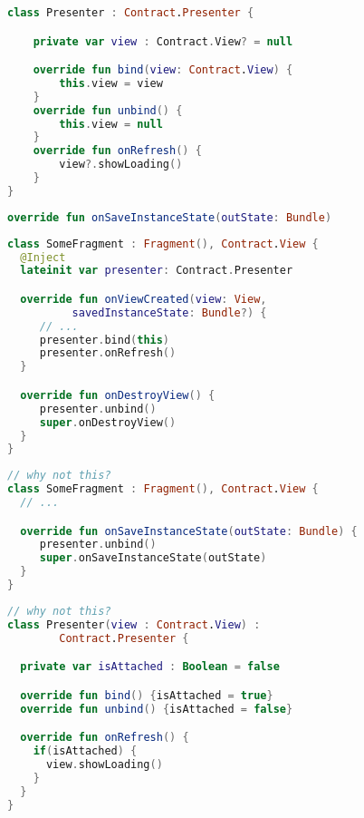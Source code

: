 \documentclass[10pt]{beamer}
\begin{document}
\begin{frame}[fragile]
\begin{lstlisting}[language=Kotlin, basicstyle=\ttfamily]
class Presenter : Contract.Presenter {

    private var view : Contract.View? = null

    override fun bind(view: Contract.View) {
        this.view = view
    }
    override fun unbind() {
        this.view = null
    }
    override fun onRefresh() {
        view?.showLoading()
    }
}
\end{lstlisting}
\end{frame}


\begin{frame}[fragile]
\begin{lstlisting}[language=Kotlin, basicstyle=\ttfamily]
override fun onSaveInstanceState(outState: Bundle)
\end{lstlisting}
\end{frame}

\begin{frame}[fragile]
\begin{lstlisting}[language=Kotlin, basicstyle=\ttfamily]
class SomeFragment : Fragment(), Contract.View {
  @Inject
  lateinit var presenter: Contract.Presenter

  override fun onViewCreated(view: View,
          savedInstanceState: Bundle?) {
     // ...
     presenter.bind(this)
     presenter.onRefresh()
  }

  override fun onDestroyView() {
     presenter.unbind()
     super.onDestroyView()
  }
}
\end{lstlisting}
\end{frame}

\begin{frame}[fragile]
\begin{lstlisting}[language=Kotlin, basicstyle=\ttfamily]
// why not this?
class SomeFragment : Fragment(), Contract.View {
  // ...

  override fun onSaveInstanceState(outState: Bundle) {
     presenter.unbind()
     super.onSaveInstanceState(outState)
  }
}
\end{lstlisting}
\end{frame}

\begin{frame}[fragile]
\begin{lstlisting}[language=Kotlin, basicstyle=\ttfamily]
// why not this?
class Presenter(view : Contract.View) : 
        Contract.Presenter {

  private var isAttached : Boolean = false

  override fun bind() {isAttached = true}
  override fun unbind() {isAttached = false}

  override fun onRefresh() {
    if(isAttached) { 
      view.showLoading()
    }
  }
}
\end{lstlisting}
\end{frame}
\end{document}
